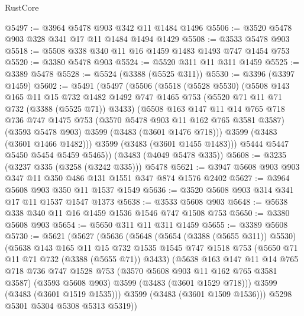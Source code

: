 \begin{lexlean}{RustCore}
\begin{coremodule}
@5497 := @3964 @5478 @903 @342 @11 @1484 @1496
@5506 := @3520 @5478 @903 @328 @341 @17 @11 @1484 @1494 @1429
@5508 := @3533 @5478 @903
@5518 := @5508 @338 @340 @11 @16 @1459 @1483 @1493 @747 @1454 @753
@5520 := @3380 @5478 @903
@5524 := @5520 @311 @11 @311 @1459
@5525 := @3389 @5478
@5528 := @5524 (@3388 (@5525 @311))
@5530 := @3396 (@3397 @1459)
@5602 := @5491
    (@5497
      (@5506
        (@5518
          (@5528 @5530)
          (@5508
            @143
            @165
            @11
            @15
            @732
            @1482
            @1492
            @747
            @1465
            @753
            (@5520 @71 @11 @71 @732 (@3388 (@5525 @71)) @3433)
            (@5508
              @163
              @147
              @11
              @14
              @765
              @718
              @736
              @747
              @1475
              @753
              (@3570 @5478 @903 @11 @162 @765 @3581 @3587)
              (@3593 @5478 @903)
              @3599
              (@3483 (@3601 @1476 @718)))
            @3599
            (@3483 (@3601 @1466 @1482)))
          @3599
          (@3483 (@3601 @1455 @1483)))
        @5444
        @5447
        @5450
        @5454
        @5459
        @5465))
    (@3483 (@4049 @5478 @335))
@5608 := @3235 (@3237 @335 (@3258 (@3242 @335))) @5478
@5621 := @3947 @5608 @903 @903 @347 @11 @350 @486 @131 @1551 @347 @874 @1576 @2402
@5627 := @3964 @5608 @903 @350 @11 @1537 @1549
@5636 := @3520 @5608 @903 @314 @341 @17 @11 @1537 @1547 @1373
@5638 := @3533 @5608 @903
@5648 := @5638 @338 @340 @11 @16 @1459 @1536 @1546 @747 @1508 @753
@5650 := @3380 @5608 @903
@5654 := @5650 @311 @11 @311 @1459
@5655 := @3389 @5608
@5730 := @5621
    (@5627
      (@5636
        (@5648
          (@5654 (@3388 (@5655 @311)) @5530)
          (@5638
            @143
            @165
            @11
            @15
            @732
            @1535
            @1545
            @747
            @1518
            @753
            (@5650 @71 @11 @71 @732 (@3388 (@5655 @71)) @3433)
            (@5638
              @163
              @147
              @11
              @14
              @765
              @718
              @736
              @747
              @1528
              @753
              (@3570 @5608 @903 @11 @162 @765 @3581 @3587)
              (@3593 @5608 @903)
              @3599
              (@3483 (@3601 @1529 @718)))
            @3599
            (@3483 (@3601 @1519 @1535)))
          @3599
          (@3483 (@3601 @1509 @1536)))
        @5298
        @5301
        @5304
        @5308
        @5313
        @5319))

\end{coremodule}
\end{lexlean}
